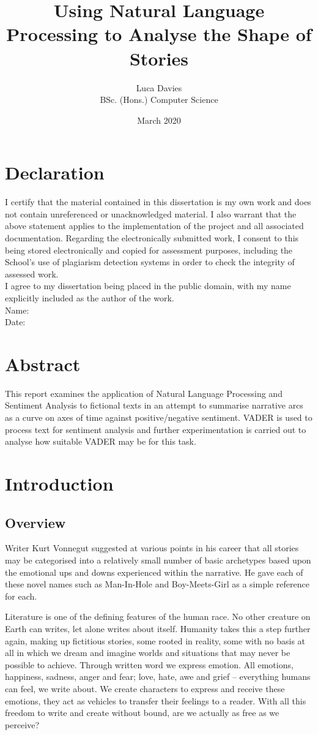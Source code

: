 \documentclass{article}
\title{\textbf{Using Natural Language Processing to Analyse the Shape of Stories}}
\author{
Luca Davies \\ BSc. (Hons.) Computer Science}
\date{March 2020}
\begin{document}
\maketitle
\newpage
\section*{Declaration}
    I certify that the material contained in this dissertation is my own work and does not contain unreferenced or unacknowledged material. I also warrant that the above statement applies to the implementation of the project and all associated documentation. Regarding the electronically submitted work, I consent to this being stored electronically and copied for assessment purposes, including the School’s use of plagiarism detection systems in order to check the integrity of assessed work. \\
    I agree to my dissertation being placed in the public domain, with my name explicitly included as the author of the work. \\
    
    \noindent
    Name: \\
    Date:
\newpage
\section*{Abstract}
    This report examines the application of Natural Language Processing and Sentiment Analysis to fictional texts in an attempt to summarise narrative arcs as a curve on axes of time against positive/negative sentiment. VADER is used to process text for sentiment analysis and further experimentation is carried out to analyse how suitable VADER may be for this task.
\newpage
\tableofcontents
\newpage
\section{Introduction}
    \subsection{Overview}
        Writer Kurt Vonnegut suggested at various points in his career that all stories may be categorised into a relatively small number of basic archetypes based upon the emotional ups and downs experienced within the narrative. He gave each of these novel names such as Man-In-Hole and Boy-Meets-Girl as a simple reference for each. \cite{vonnegutLecture}

        Literature is one of the defining features of the human race. No other creature on Earth can writes, let alone writes about itself. Humanity takes this a step further again, making up fictitious stories, some rooted in reality, some with no basis at all in which we dream and imagine worlds and situations that may never be possible to achieve. Through written word we express emotion. All emotions, happiness, sadness, anger and fear; love, hate, awe and grief – everything humans can feel, we write about. We create characters to express and receive these emotions, they act as vehicles to transfer their feelings to a reader. With all this freedom to write and create without bound, are we actually as free as we perceive?
\end{document}

